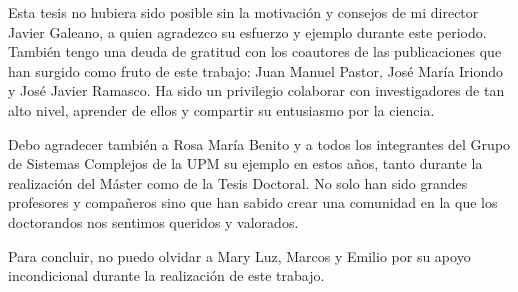 \documentclass[
11pt, %
spanish, %
onehalfspacing, %
]{MastersDoctoralThesis_custom} %
\begin{document}
\clearpage
\begin{acknowledgements}
\addchaptertocentry{\acknowledgementname} %

Esta tesis no hubiera sido posible sin la motivación y consejos de mi director Javier Galeano, a quien
agradezco su esfuerzo y ejemplo durante este periodo. También tengo una deuda de gratitud con los coautores
de las publicaciones que han surgido como fruto de este trabajo: Juan Manuel Pastor,
José María Iriondo y José Javier Ramasco. Ha sido un privilegio colaborar con investigadores de tan alto nivel,
aprender de ellos y compartir su entusiasmo por la ciencia.

Debo agradecer también a Rosa María Benito y a todos los integrantes del Grupo de Sistemas Complejos
de la UPM su ejemplo en estos años, tanto durante la realización del Máster como de la Tesis Doctoral.
No solo han sido grandes profesores y compañeros sino que han sabido crear una comunidad en la que
los doctorandos nos sentimos queridos y valorados.

Para concluir, no puedo olvidar a Mary Luz, Marcos y Emilio por su apoyo incondicional 
durante la realización de este trabajo.

\end{acknowledgements}
\clearpage

\end{document}
